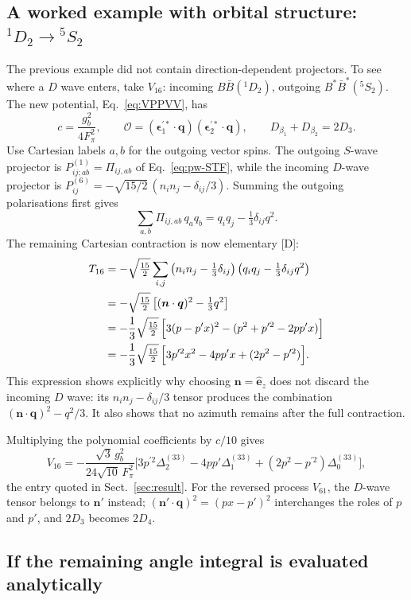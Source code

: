 \documentclass[11pt,a4paper]{article}
\newcommand{\tagD}{\textcolor{orange!85!black}{\textsf{\small[D]}}}
\newcommand{\BB}{B\bar B}
\newcommand{\BstBst}{B^*\bar B^*}
\newcommand{\D}[2]{\Delta^{(#1)}_{#2}}
\newcommand{\vq}{\bm q}
\newcommand{\vn}{\bm n}
\newcommand{\veps}{\bm\epsilon}
\begin{document}
\subsection{A worked example with orbital structure: $^1D_2\to{}^5S_2$}

The previous example did not contain direction-dependent projectors. To see where a $D$ wave enters, take $V_{16}$: incoming $\BB(^1D_2)$, outgoing $\BstBst(^5S_2)$. The new potential, Eq.~\eqref{eq:VPPVV}, has
\[
c=\frac{g_b^2}{4F_\pi^2},\qquad
\mathcal O=(\veps_1^{\prime*}\cdot\vq)
(\veps_2^{\prime*}\cdot\vq),\qquad
D_{\beta_1}+D_{\beta_2}=2D_3.
\]
Use Cartesian labels $a,b$ for the outgoing vector spins. The outgoing $S$-wave projector is
$P^{(1)}_{ij;ab}=\Pi_{ij,ab}$ of Eq.~\eqref{eq:pw-STF}, while the incoming $D$-wave projector is
$P^{(6)}_{ij}=-\sqrt{15/2}\,(n_i n_j-\delta_{ij}/3)$. Summing the outgoing polarisations first gives
\[
\sum_{a,b}\Pi_{ij,ab}\,q_aq_b
=q_iq_j-\tfrac13\delta_{ij}q^2.
\]
The remaining Cartesian contraction is now elementary \tagD:
\begin{align}
T_{16}
&=-\sqrt{\tfrac{15}{2}}\sum_{i,j}
\left(n_i n_j-\tfrac13\delta_{ij}\right)
\left(q_iq_j-\tfrac13\delta_{ij}q^2\right)\notag\\
&=-\sqrt{\tfrac{15}{2}}\left[(\vn\cdot\vq)^2-\tfrac13q^2\right]\notag\\
&=-\frac13\sqrt{\tfrac{15}{2}}\,
\Big[3(p-p'x)^2-(p^2+p^{\prime2}-2pp'x)\Big]\notag\\
&=-\frac13\sqrt{\tfrac{15}{2}}\,
\Big[3p^{\prime2}x^2-4pp'x+(2p^2-p^{\prime2})\Big].
\label{eq:pw-T16}
\end{align}
This expression shows explicitly why choosing $\vn=\hat{\bm e}_z$ does not discard the incoming $D$ wave: its $n_i n_j-\delta_{ij}/3$ tensor produces the combination $(\vn\cdot\vq)^2-q^2/3$. It also shows that no azimuth remains after the full contraction.

Multiplying the polynomial coefficients by $c/10$ gives
\[
V_{16}
=-\frac{\sqrt3\,g_b^2}{24\sqrt{10}\,F_\pi^2}
\Big[3p^{\prime2}\D{33}{2}
-4pp'\D{33}{1}
+(2p^2-p^{\prime2})\D{33}{0}\Big],
\]
the entry quoted in Sect.~\ref{sec:result}. For the reversed process $V_{61}$, the $D$-wave tensor belongs to $\vn'$ instead; $(\vn'\cdot\vq)^2=(px-p')^2$ interchanges the roles of $p$ and $p'$, and $2D_3$ becomes $2D_4$.

\subsection{If the remaining angle integral is evaluated analytically}
\end{document}
